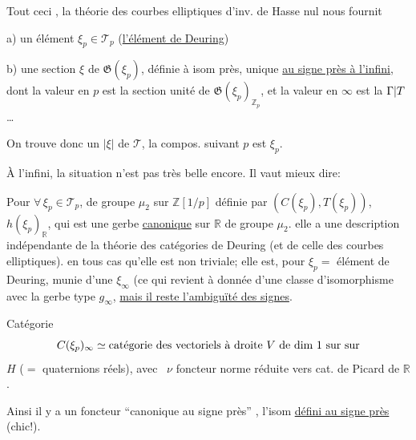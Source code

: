 Tout ceci , la théorie  des courbes elliptiques d'inv. de Hasse nul nous fournit

a) un élément $\xi_p\in\mathcal T_p$ (\uline{l'élément de Deuring})

b) une section  $\xi$ de $\mathfrak G(\xi_p)$, définie à isom près, unique \uline{au signe près à l'infini}, dont la valeur en $p$  est la section unité  de $\mathfrak G(\xi_p)_{\mathbb Z_p}$, et la valeur en $\infty$ est la  $\Gamma|T$\ldots

On trouve donc un  $|\xi|$ de $\mathcal T$,  la compos. suivant $p$ est $\xi_p$.


À l'infini, la situation n'est pas très belle encore. Il vaut mieux dire:

Pour $\forall\,\xi_p\in\mathcal T_p$,
de groupe $\mu_2$ sur $\mathbb Z[1/p]$ définie par $(C(\xi_p),T(\xi_p))$,
$h(\xi_p)_{\mathbb R}$, qui est une gerbe \uline{canonique} sur $\mathbb R$ de groupe $\mu_2$.
elle a une description indépendante de la théorie des catégories de Deuring (et de celle des courbes elliptiques).
 en tous cas qu'elle est non triviale; elle est, pour $\xi_p=$ élément de Deuring, munie d'une  $\xi_\infty$ (ce qui revient à donnée d'une classe d'isomorphisme  avec la gerbe type $g_\infty$, \uline{mais il reste l'ambiguïté des signes}.

Catégorie
\[
C(\xi_p)_\infty\simeq
\text{catégorie des vectoriels à droite $V$ de dim $1$ sur sur}
\]
$H$ ($=$ quaternions réels), avec \ $\nu$ foncteur norme réduite vers cat. de Picard de $\mathbb R$.

Ainsi il y a un foncteur ``canonique au signe près''
 , l'isom \uline{défini au signe près} (chic!).

